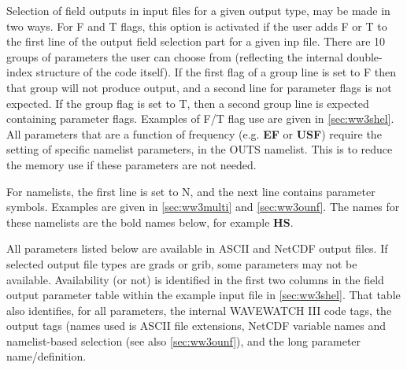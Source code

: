 Selection of field outputs in input files for a given output type, 
may be made in two ways. For F and T flags, this option is activated if the user
adds F or T to the first line of the output field selection part for a given inp
file. There are 10 groups of parameters the user can choose from (reflecting the 
internal double-index structure of the code itself). If the first flag of a group 
line is set to F then that group will not produce output, and a second line for 
parameter flags is not expected. If the group flag is set to T, then
a second group line is expected containing parameter flags. Examples of F/T flag 
use are given in  \para\ref{sec:ww3shel}.
All parameters that are a function of frequency (e.g.  \textbf{EF} or \textbf{USF}) require the setting 
of specific namelist parameters, in the {\F OUTS} namelist. This is to reduce the memory use
if these parameters are not needed. 

For namelists, the first line is set to N, and the next line contains parameter
symbols. Examples are given in \para\ref{sec:ww3multi} and
\para\ref{sec:ww3ounf}. The names for these namelists are the bold names below, for 
example \textbf{HS}. 

All parameters listed below are available in ASCII and NetCDF output files. If selected output file types are grads or grib,
some parameters may not be available. Availability (or not) is identified
in the first two columns in the field output parameter table within the example input file in  
\para\ref{sec:ww3shel}. That table also identifies, for all parameters,
the internal WAVEWATCH III code tags, the output tags (names used is ASCII 
file extensions, NetCDF variable names and namelist-based selection (see 
also \para\ref{sec:ww3ounf}), and the long parameter name/definition.

